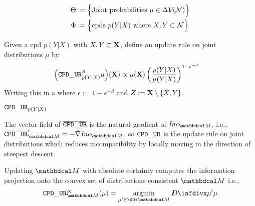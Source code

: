 \documentclass{article}
\newcommand{\ext}[1]{\overline #1} %
\begin{document}
\begin{align*}
    \Theta &:=
        \Big\{
        \text{Joint probabilities}~ \mu \in \Delta \mathcal V(\mathcal N)
        \Big\} \\
    \Phi &:= \Big\{ \text{cpds}~ p(Y|X)
        \text{ where }  X, Y \subset \mathcal N \Big\}
\end{align*}

Given a cpd $p(Y|X)$ with $X,Y \subset \mathbf{X}$,
define an update rule on joint distributions $\mu$ by
\begin{align*}
    \Big(\mathtt{CPD\_UR}_{p(Y|X)}^\beta \mu\Big) (\mathbf{X}) &\propto
        \mu(\mathbf{X}) \left(\frac{p(Y|X)}{\mu(Y|X)}\right)^{1 - e^{-\beta}}
\end{align*}
Writing this in a
where $\epsilon := 1-e^{-\beta}$ and $Z := \mathbf{X} \setminus \{X,Y\}$.

\begin{prop}
    $\mathtt{CPD\_UR}_{p(Y|X)}$
\end{prop}

\begin{prop}
    The vector field of $\ext\tauur$ is the natural gradient of $\Inc_{\dg M}$, i.e.,
    $
        \ext\tauur'_{\dg M} = - \hat \nabla \Inc_{\dg M},
    $
    so $\mathtt{CPD\_UR}$ is the update rule on joint distributions which reduces incompatibility by locally moving in the direction of steepest descent.
\end{prop}

\begin{prop}
        Updating $\dg M$ with absolute certainty computes the information projection onto the convex set of distributions consistent $\dg M$ i.e.,
        $$\displaystyle
            \tauur_{\dg M}^\infty(\mu) = \argmin_{\mu' \in \SD*{\dg M}} \kldiv{\mu'}{\mu}
        $$

\end{prop}
\end{document}
